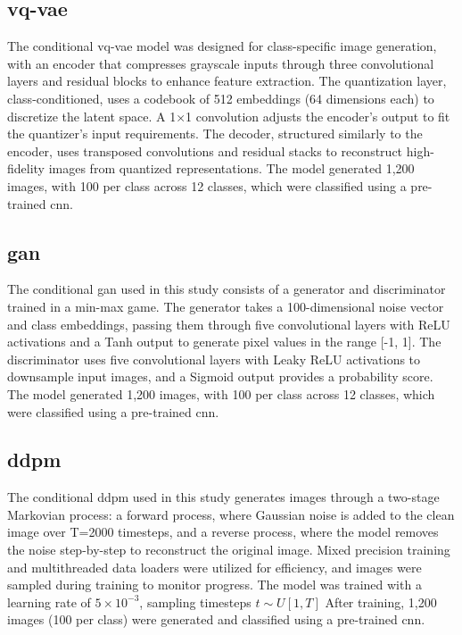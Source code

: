 \subsection{\gls{vq-vae}}
The conditional \gls{vq-vae} model was designed for class-specific image generation, with an encoder that compresses grayscale inputs through three convolutional layers and residual blocks to enhance feature extraction. The quantization layer, class-conditioned, uses a codebook of 512 embeddings (64 dimensions each) to discretize the latent space. A 1×1 convolution adjusts the encoder's output to fit the quantizer's input requirements. The decoder, structured similarly to the encoder, uses transposed convolutions and residual stacks to reconstruct high-fidelity images from quantized representations. The model generated 1,200 images, with 100 per class across 12 classes, which were classified using a pre-trained \gls{cnn}.

\subsection{\gls{gan}}
The conditional \gls{gan} used in this study consists of a generator and discriminator trained in a min-max game. The generator takes a 100-dimensional noise vector and class embeddings, passing them through five convolutional layers with ReLU activations and a Tanh output to generate pixel values in the range [-1, 1]. The discriminator uses five convolutional layers with Leaky ReLU activations to downsample input images, and a Sigmoid output provides a probability score. The model generated 1,200 images, with 100 per class across 12 classes, which were classified using a pre-trained \gls{cnn}.

\subsection{\gls{ddpm}}
The conditional \gls{ddpm} used in this study generates images through a two-stage Markovian process: a forward process, where Gaussian noise is added to the clean image over T=2000 timesteps, and a reverse process, where the model removes the noise step-by-step to reconstruct the original image. Mixed precision training and multithreaded data loaders were utilized for efficiency, and images were sampled during training to monitor progress. The model was trained with a learning rate of $5\times10^{-3}$, sampling timesteps $t\sim U[1,T]$ After training, 1,200 images (100 per class) were generated and classified using a pre-trained \gls{cnn}.

